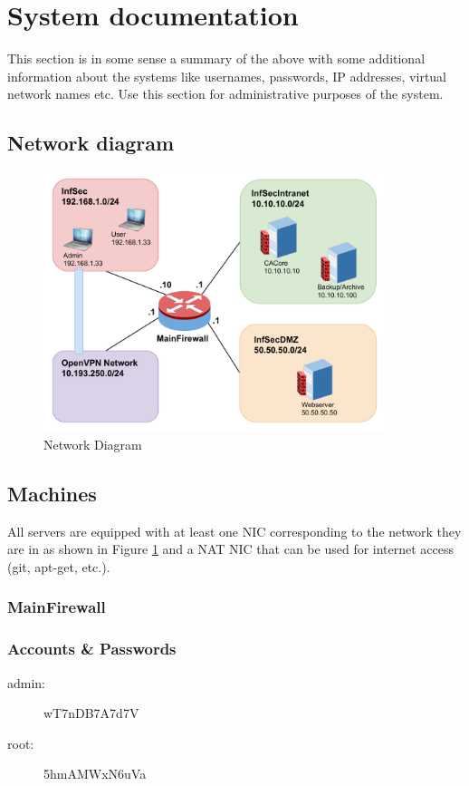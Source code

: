 \documentclass[a4paper, toc=index, 12pt, DIV14, twoside, BCOR2cm, headsepline, numbers=noenddot, bibliography=totoc]{scrbook}
\begin{document}
\section{System documentation}
This section is in some sense a summary of the above with some additional information about the systems like usernames, passwords, IP addresses, virtual network names etc. Use this section for administrative purposes of the system.\newline

\subsection{Network diagram}

\begin{figure}[H]
  \centering
    \includegraphics[width=0.9\textwidth]{images/sysseclab_net_diagram.pdf}  
  \caption{Network Diagram}
  \label{netdiag}
\end{figure}

\subsection{Machines}
All servers are equipped with at least one NIC corresponding to the network they are in as shown in Figure \ref{netdiag} and a NAT NIC that can be used for internet access (git, apt-get, etc.).
\subsubsection{MainFirewall}
\subsubsection*{Accounts \& Passwords}
\begin{multicols}{2}
\begin{description}
\item[admin:] wT7nDB7A7d7V
\item[root:] 5hmAMWxN6uVa
\end{description}
\end{multicols}
\end{document}
